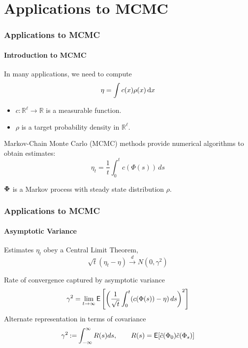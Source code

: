 \documentclass[xcolor=dvipsnames, subsection=false]{beamer}
\def\alertb#1{\alert{\color{BrickRed}  #1}}
\def\alertb#1{\alert{\color{BrickRed}  #1}}
\def\tilc{\tilde c}
\def\Expect{{\sf E}}
\def\bfmath#1{{\mathchoice{\mbox{\boldmath$#1$}}%
{\mbox{\boldmath$#1$}}%
{\mbox{\boldmath$\scriptstyle#1$}}%
{\mbox{\boldmath$\scriptscriptstyle#1$}}}}
\def\bfPhi{\bfmath{\Phi}}
\newcommand{\field}[1]{\mathbb{#1}}
\def\Re{\field{R}}
\def\eqdef{\mathbin{:=}}
\def\rmd{\,\textmd{d}}
\def\process{\Phi}
\newcommand{\pr}{\rho}
\def\Expect{{\sf E}}
\begin{document}
\begin{frame}
\begin{minipage}[t][6.5cm][t]{\textwidth}
\end{minipage}
\end{frame}

\section{Applications to MCMC}
\begin{frame}
\frametitle{Applications to MCMC}
\framesubtitle{Introduction to MCMC}
In many applications, we need to compute
\begin{equation*}
\eta = \int c(x)\pr(x) \rmd x
\label{e:eta}
\end{equation*}
\begin{itemize}
	\item $c\colon\Re^\ell\to\Re$ is a measurable function.
	\item $\pr$ is a target probability density in $\Re^\ell$.
\end{itemize}
 Markov-Chain Monte Carlo (MCMC) methods provide numerical algorithms to obtain estimates:
	\[
	\eta_t =\frac{1}{t}\int_0^t c(\process(s)) \, ds
	\label{e:sample_mean}
	\]
\begin{center}
	$\bfPhi$ is a Markov process with steady state distribution $\pr$.
\end{center}
\end{frame}

\begin{frame}
\frametitle{Applications to MCMC}
\framesubtitle{Asymptotic Variance}
Estimates $\eta_t$ obey a Central Limit Theorem,
\[
\sqrt{t} (\eta_t - \eta) \xrightarrow[]{d} N(0,\gamma^2)
\]

Rate of convergence captured by \alertb{asymptotic variance}
\[
\gamma^2 = \lim_{t \to \infty} \Expect \left[\left(\frac{1}{\sqrt{t}}\int_{0}^{t}(c(\process(s))-\eta)\,ds\right)^2\right]
\]
Alternate representation in terms of covariance
\[
\gamma^2  \eqdef \int_{-\infty}^\infty R(s) ds, \qquad R(s) = \Expect [\tilc(\Phi_0) \tilc(\Phi_s)]
\]
\normalsize
\end{frame}
\end{document}
